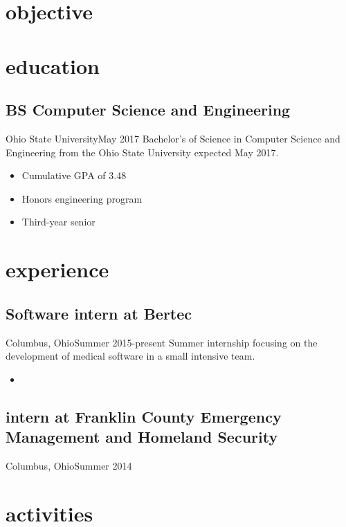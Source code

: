 \documentclass[letterpaper]{cv}
\begin{document}
	\author{Brandon A. Moore}
	\maketitle
	
	\section{objective}
		
	\section{education}
		\subsection{BS Computer Science and Engineering}{Ohio State University}{May 2017}
			Bachelor's of Science in Computer Science and Engineering from the Ohio State University expected May 2017.
			\begin{itemize}
				\item Cumulative GPA of 3.48
				\item Honors engineering program
				\item Third-year senior
			\end{itemize}

	\section{experience}
		\subsection{Software intern at Bertec}{Columbus, Ohio}{Summer 2015-present}
			Summer internship focusing on the development of medical software in a small intensive team.
			\begin{itemize}
				\item 
			\end{itemize}
	
		\subsection{intern at Franklin County Emergency\\ Management and Homeland Security}{Columbus, Ohio}{Summer 2014}

	\section{activities}
\end{document}
